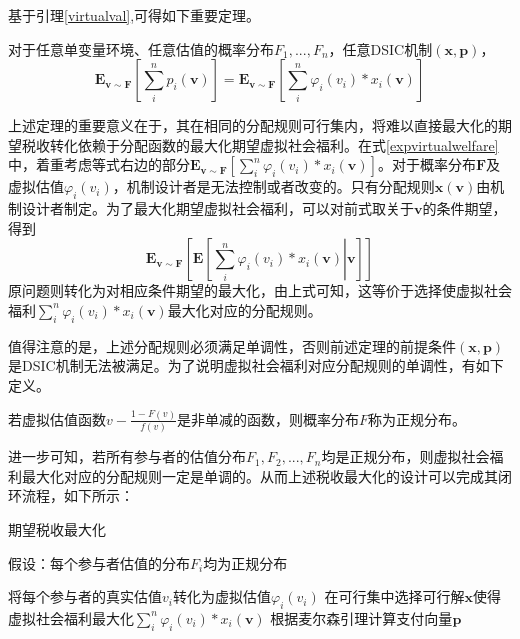 \documentclass[promaster]{thesis-uestc}
\begin{document}
基于引理\ref{virtualval},可得如下重要定理。
\begin{theorem}[期望税收等于期望虚拟社会福利]
    对于任意单变量环境、任意估值的概率分布$F_1,...,F_n$，任意DSIC机制$(\mathbf{x},\mathbf{p})$，
    \begin{equation}
    \label{expvirtualwelfare}
    \mathbf{E}_{\mathbf{v}\sim\mathbf{F}}{\left[\sum_{i}^{n}{p_i(\mathbf{v})}\right]}=\mathbf{E}_{\mathbf{v}\sim\mathbf{F}}{\left[\sum_{i}^{n}{\varphi _i(v_i)*x_i(\mathbf{v})}\right]}
    \end{equation}
\end{theorem}

上述定理的重要意义在于，其在相同的分配规则可行集内，将难以直接最大化的期望税收转化依赖于分配函数的最大化期望虚拟社会福利。在式\ref{expvirtualwelfare}中，着重考虑等式右边的部分$\mathbf{E}_{\mathbf{v}\sim\mathbf{F}}{\left[\sum_{i}^{n}{\varphi _i(v_i)*x_i(\mathbf{v})}\right]}$。对于概率分布$\mathbf{F}$及虚拟估值$\varphi_i(v_i)$，机制设计者是无法控制或者改变的。只有分配规则$\mathbf{x(v)}$由机制设计者制定。为了最大化期望虚拟社会福利，可以对前式取关于$\mathbf{v}$的条件期望，得到
\begin{equation}
\mathbf{E}_{\mathbf{v}\sim\mathbf{F}}{\left[\mathbf{E}\left[\left.\sum_{i}^{n}{\varphi _i(v_i)*x_i(\mathbf{v})}\right|\mathbf{v}\right]\right]}
\end{equation}
原问题则转化为对相应条件期望的最大化，由上式可知，这等价于选择使虚拟社会福利$\sum_{i}^{n}{\varphi _i(v_i)*x_i(\mathbf{v})}$最大化对应的分配规则。

值得注意的是，上述分配规则必须满足单调性，否则前述定理的前提条件$(\mathbf{x},\mathbf{p})$是DSIC机制无法被满足。为了说明虚拟社会福利对应分配规则的单调性，有如下定义。
\begin{definition}[正规分布]
若虚拟估值函数$v-\frac{1-F(v)}{f(v)}$是非单减的函数，则概率分布$F$称为正规分布。 
\end{definition}
进一步可知，若所有参与者的估值分布$F_1,F_2,...,F_n$均是正规分布，则虚拟社会福利最大化对应的分配规则一定是单调的。从而上述税收最大化的设计可以完成其闭环流程，如下所示：

\begin{algorithm}[H]
\caption{期望税收最大化}
假设：每个参与者估值的分布$F_i$均为正规分布\;

将每个参与者的真实估值$v_i$转化为虚拟估值$\varphi_i(v_i)$\;
在可行集中选择可行解$\mathbf{x}$使得虚拟社会福利最大化$\sum_{i}^{n}{\varphi _i(v_i)*x_i(\mathbf{v})}$\;
根据麦尔森引理计算支付向量$\mathbf{p}$\;
\end{algorithm}
\end{document}
